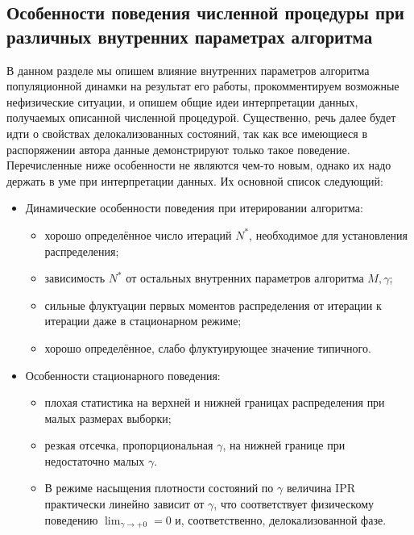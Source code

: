 \subsection{Особенности поведения численной процедуры при различных внутренних параметрах алгоритма}
В данном разделе мы опишем влияние внутренних параметров алгоритма популяционной динамки на результат его работы, прокомментируем возможные нефизические ситуации, и опишем общие идеи интерпретации данных, получаемых описанной численной процедурой. Существенно, речь далее будет идти о свойствах делокализованных состояний, так как все имеющиеся в распоряжении автора данные демонстрируют только такое поведение. Перечисленные ниже особенности не являются чем-то новым, однако их надо держать в уме при интерпретации данных. Их основной список следующий:
\begin{itemize}
	\item Динамические особенности поведения при итерировании алгоритма:
	\begin{itemize}
		\item хорошо определённое число итераций $N^{*}$, необходимое для установления распределения;
		\item зависимость $N^{*}$ от остальных внутренних параметров алгоритма $M, \gamma$;
		\item сильные флуктуации первых моментов распределения от итерации к итерации даже в стационарном режиме;
		\item хорошо определённое, слабо флуктуирующее значение типичного.
	\end{itemize}
	\item Особенности стационарного поведения:
	\begin{itemize}
		\item плохая статистика на верхней и нижней границах распределения при малых размерах выборки;
		\item резкая отсечка, пропорциональная $\gamma$, на нижней границе при недостаточно малых $\gamma$.
		\item В режиме насыщения плотности состояний по $\gamma$ величина IPR практически линейно зависит от $\gamma$, что соответствует физическому поведению $\lim_{\gamma \rightarrow +0} = 0$ и, соответственно, делокализованной фазе.
	\end{itemize}
\end{itemize}

